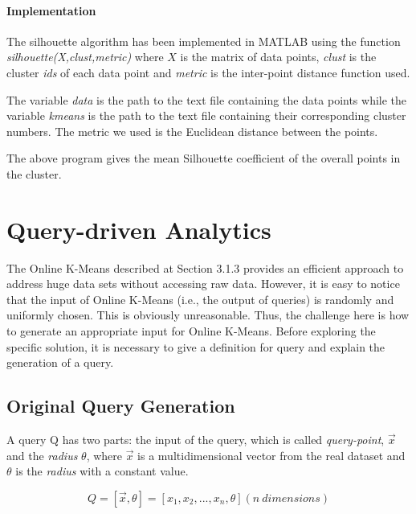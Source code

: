 \documentclass{lmproj}
\begin{document}
\subsubsection{Implementation}
The silhouette algorithm has been implemented in MATLAB using the function \textit{silhouette(X,clust,metric)} where $X$ is the matrix of data points, \textit{clust} is the cluster \textit{ids} of each data point and \textit{metric} is the inter-point distance function used. 

The variable \textit{data} is the path to the text file containing the data points while the variable \textit{kmeans} is the path to the text file containing their corresponding cluster numbers. The metric we used is the Euclidean distance between the points.


The above program gives the mean Silhouette coefficient of the overall points in the cluster.

\clearpage
\chapter{Query-driven Analytics}
\label{Query-driven Analytics}

The Online K-Means described at Section 3.1.3 provides an efficient approach to address huge data sets without accessing raw data. However, it is easy to notice that the input of Online K-Means (i.e., the output of queries) is randomly and uniformly chosen. This is obviously unreasonable. Thus, the challenge here is how to generate an appropriate input for Online K-Means. Before exploring the specific solution, it is necessary to give a definition for query and explain the generation of a query. 

\section{Original Query Generation}

A query Q has two parts: the input of the query, which is called \textit{query-point}, $\vec{x} $ and the \textit{radius} $ \theta $, where $\vec{x} $ is a multidimensional vector from the real dataset and $ \theta $ is the \textit{radius} with a constant value. 

\begin{equation}
	Q =[\vec{x},\theta] =[x_1,x_2,...,x_n,\theta] (n\ dimensions)
\end{equation}
\end{document}

